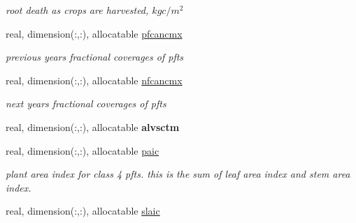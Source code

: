 \begin{DoxyCompactItemize}
\begin{DoxyCompactList}\small\item\em root death as crops are harvested, $kg c/m^2$ \end{DoxyCompactList}\item 
\hypertarget{structctem__statevars_1_1veg__gat_a3c978263649aba6951c799b2c6b42ddc}{}real, dimension(\+:,\+:), allocatable \hyperlink{structctem__statevars_1_1veg__gat_a3c978263649aba6951c799b2c6b42ddc}{pfcancmx}\label{structctem__statevars_1_1veg__gat_a3c978263649aba6951c799b2c6b42ddc}

\begin{DoxyCompactList}\small\item\em previous year\textquotesingle{}s fractional coverages of pfts \end{DoxyCompactList}\item 
\hypertarget{structctem__statevars_1_1veg__gat_ab6b5b611465625a9c6d956d2bff9b8ed}{}real, dimension(\+:,\+:), allocatable \hyperlink{structctem__statevars_1_1veg__gat_ab6b5b611465625a9c6d956d2bff9b8ed}{nfcancmx}\label{structctem__statevars_1_1veg__gat_ab6b5b611465625a9c6d956d2bff9b8ed}

\begin{DoxyCompactList}\small\item\em next year\textquotesingle{}s fractional coverages of pfts \end{DoxyCompactList}\item 
\hypertarget{structctem__statevars_1_1veg__gat_a504e30e8f3f900f780ea671621055fb6}{}real, dimension(\+:,\+:), allocatable {\bfseries alvsctm}\label{structctem__statevars_1_1veg__gat_a504e30e8f3f900f780ea671621055fb6}

\item 
\hypertarget{structctem__statevars_1_1veg__gat_a486e4bf2f3f79c764873dc14c2af6cb1}{}real, dimension(\+:,\+:), allocatable \hyperlink{structctem__statevars_1_1veg__gat_a486e4bf2f3f79c764873dc14c2af6cb1}{paic}\label{structctem__statevars_1_1veg__gat_a486e4bf2f3f79c764873dc14c2af6cb1}

\begin{DoxyCompactList}\small\item\em plant area index for class\textquotesingle{} 4 pfts. this is the sum of leaf area index and stem area index. \end{DoxyCompactList}\item 
\hypertarget{structctem__statevars_1_1veg__gat_a6ed9e274cbbb78a1392380964fe0b326}{}real, dimension(\+:,\+:), allocatable \hyperlink{structctem__statevars_1_1veg__gat_a6ed9e274cbbb78a1392380964fe0b326}{slaic}\label{structctem__statevars_1_1veg__gat_a6ed9e274cbbb78a1392380964fe0b326}


\end{DoxyCompactItemize}
